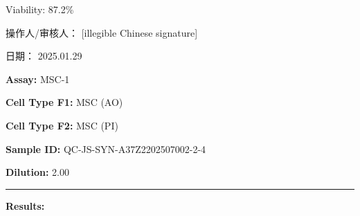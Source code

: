 \documentclass[UTF8,10pt,a4paper,fontset=fandol]{ctexart}
\newcommand{\fieldvalue}[1]{#1}
\newcommand{\handwritten}[1]{#1}
\begin{document}
\begin{center}
\begin{center}
\medskip
\noindent
Viability:
\fieldvalue{87.2\%}

\bigskip

\begin{center}
\hfill
{}

\vspace{0.4cm}

\hfill
{}
\end{center}

\vfill

\noindent
操作人/审核人：
\fieldvalue{\handwritten{[illegible Chinese signature]}}

\hfill
日期：
\fieldvalue{\handwritten{2025.01.29}}

\newpage

\noindent\textbf{Assay:} 
\fieldvalue{MSC-1}

\medskip
\noindent\textbf{Cell Type F1:} 
\fieldvalue{MSC (AO)}

\noindent\textbf{Cell Type F2:} 
\fieldvalue{MSC (PI)}

\medskip
\noindent\textbf{Sample ID:} 
\fieldvalue{QC-JS-SYN-A37Z2202507002-2-4}

\noindent\textbf{Dilution:} 
\fieldvalue{2.00}

\medskip
\noindent\rule{\textwidth}{0.4pt}

\noindent\textbf{Results:}


\end{center}
\end{center}
\end{document}
